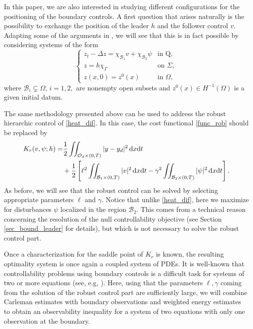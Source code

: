 \documentclass{dcds-bOF}
\theoremstyle{definition}
\newcommand\csin[1]{\chi_{#1}}
\def\dx{\,\textnormal{d}x}
\def\dt{\textnormal{d}t}
\begin{document}
In this paper, we are also interested in studying different configurations for the positioning of the boundary controls. A first question that arises naturally is the possibility to exchange the position of the leader $h$ and the follower control $v$. Adapting some of the arguments in \cite{da_silva}, we will see that this is in fact possible by considering systems of the form
%
\begin{equation}\label{heat_dif}
\begin{cases}
z_t-\Delta z=\csin{\mathcal B_1}v+\csin{\mathcal B_2}\psi & \text{in Q}, \\
z=h\csin{\Gamma} &\text{on } \Sigma, \\
z(x,0)=z^0(x) & \text{in } \Omega,
\end{cases}
\end{equation}
%
where {$\mathcal B_i \subsetneq \Omega$}, $i=1,2,$ are nonempty open subsets and ${z^0(x)\in H^{-1}(\Omega)}$ is a given initial datum.

The same methodology presented above can be used to address the robust hierarchic control of \eqref{heat_dif}. In this case, the cost functional \eqref{func_rob} should be replaced by
%
\begin{equation}\label{func_rob_dif}
\begin{split}
K_r(v,\psi;h)=&\frac{1}{2}\iint_{\mathcal O_d\times(0,T)}|y-y_d|^2\dx\dt\\
&+\frac{1}{2}\left[\ell^2\iint_{\mathcal B_1\times(0,T)}|v|^2\dx\dt-\gamma^2\iint_{\mathcal B_2\times(0,T)}|\psi|^2\dx\dt\right].
\end{split}
\end{equation}
%
As before, we will see that the robust control can be solved by selecting appropriate parameters $\ell$ and $\gamma$. Notice that unlike \eqref{heat_dif}, here we maximize for disturbances $\psi$ localized in the region $\mathcal B_2$. This comes from a technical reason concerning the resolution of the null controllability objective (see Section {\ref{sec_bound_leader}} for details), but which is not necessary to solve the robust control part.

Once a characterization for the saddle point of $K_r$ is known, the resulting optimality system is once again a coupled system of PDEs. It is well-known that controllability problems using boundary controls is a difficult task for systems of two or more equations (see, e.g, \cite{assia_survey,assia_luz_new}). Here,  using that the parameters $\ell,\gamma$ coming from the solution of the robust control part are sufficiently large, we will combine Carleman estimates with boundary observations and weighted energy estimates to obtain an observability inequality for a system of two equations with only one observation at the boundary.
\end{document}
